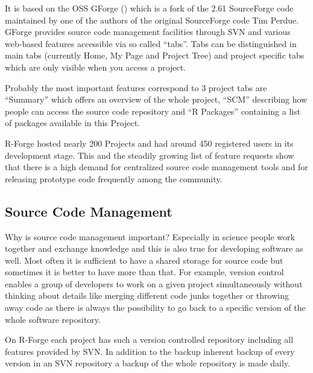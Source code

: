It is based on the OSS GForge (\citep{forge:copeland_et_al:2006}) which is a
fork of the 2.61 SourceForge code maintained by one of the authors of
the original SourceForge code Tim Perdue. GForge provides source code
management facilities through SVN and various web-based features
accessible via so called ``tabs''. Tabs can be distinguished in main
tabs (currently Home, My Page and Project Tree) and project specific
tabs which are only visible when you access a project.



Probably the most important features correspond to 3 project tabs are
``Summary'' which offers an overview of the whole project, ``SCM''
describing how people can access the source code repository and ``R
Packages'' containing a list of packages available in this Project.

R-Forge hosted nearly 200 Projects and had around 450
registered users in its development stage. This and the steadily growing list of
feature requests show that there is a high demand for centralized source code
management tools and for releasing prototype code frequently among the
\R{} community.

\subsection{Source Code Management}

Why is source code management important? Especially in science people
work together and exchange knowledge and 
this is also true for developing software as well. Most often it is
sufficient to have a shared storage for source code but sometimes it
is better to have more than that. For example, version control enables
a group of developers to work on a given project simultaneously
without thinking about details like merging different code junks
together or throwing away code as there is always the possibility to
go back to a specific version of the whole software repository.

On R-Forge each project has such a version controlled repository
including all features provided by SVN. In addition to the
backup inherent backup of every version in an SVN repository a backup
of the whole repository is made daily. 

